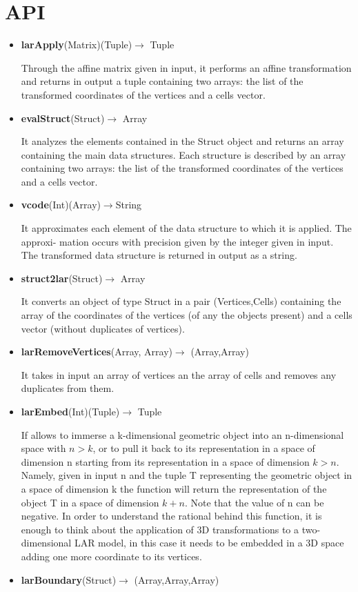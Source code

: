 \documentclass[a4paper,12pt]{article}
\begin{document}
\section{API}
\begin{itemize}
\item \textbf{larApply}(Matrix)(Tuple)$\rightarrow$ Tuple

Through the affine matrix given in input, it performs an affine transformation and returns
in output a tuple containing two arrays: the list of the transformed coordinates of the
vertices and a cells vector.
\item \textbf{evalStruct}(Struct)$\rightarrow$ Array

It analyzes the elements contained in the Struct object and returns an array containing
the main data structures. Each structure is described by an array containing two arrays:
the list of the transformed coordinates of the vertices and a cells vector.
\item  \textbf{vcode}(Int)(Array)$\rightarrow$String

It approximates each element of the data structure to which it is applied. The approxi-
mation occurs with precision given by the integer given in input. The transformed data
structure is returned in output as a string.
\item \textbf{struct2lar}(Struct)$\rightarrow$ Array

It converts an object of type Struct in a pair (Vertices,Cells) containing the array of
the coordinates of the vertices (of any the objects present) and a cells vector (without
duplicates of vertices).
\item \textbf{larRemoveVertices}(Array, Array)$\rightarrow$ (Array,Array)

It takes in input an array of vertices an the array of cells and removes any duplicates
from them.
\item \textbf{larEmbed}(Int)(Tuple)$\rightarrow$ Tuple

If allows to immerse a k-dimensional geometric object into an n-dimensional space with
$n > k$, or to pull it back to its representation in a space of dimension n starting from its
representation in a space of dimension $k > n$. Namely, given in input n and the tuple T
representing the geometric object in a space of dimension k the function will return the
representation of the object T in a space of dimension $k + n$. Note that the value of n
can be negative. In order to understand the rational behind this function, it is enough
to think about the application of 3D transformations to a two-dimensional LAR model,
in this case it needs to be embedded in a 3D space adding one more coordinate to its
vertices.
\item \textbf{larBoundary}(Struct)$\rightarrow$ (Array,Array,Array)


\end{itemize}
\end{document}
